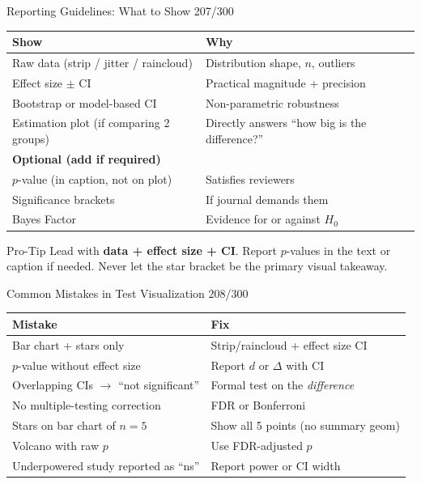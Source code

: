 \documentclass[10pt]{beamer}
\newcommand{\smark}[1]{\hfill{\scriptsize\color{codegray}#1}}
\begin{document}
\begin{frame}{Reporting Guidelines: What to Show}
\smark{207/300}
\centering\small
\begin{tabular}{@{}ll@{}}
    \toprule
    \textbf{Show} & \textbf{Why} \\
    \midrule
    Raw data (strip / jitter / raincloud)  & Distribution shape, $n$, outliers \\
    Effect size $\pm$ CI                    & Practical magnitude + precision \\
    Bootstrap or model-based CI             & Non-parametric robustness \\
    Estimation plot (if comparing 2 groups) & Directly answers ``how big is the difference?'' \\
    \midrule
    \textbf{Optional (add if required)} & \\
    \midrule
    $p$-value (in caption, not on plot)     & Satisfies reviewers \\
    Significance brackets                   & If journal demands them \\
    Bayes Factor                            & Evidence for or against $H_0$ \\
    \bottomrule
\end{tabular}

\vspace{0.3cm}
\begin{alertblock}{Pro-Tip}
    \scriptsize Lead with \textbf{data + effect size + CI}. Report $p$-values in the text or caption if needed. Never let the star bracket be the primary visual takeaway.
\end{alertblock}
\end{frame}

\begin{frame}{Common Mistakes in Test Visualization}
\smark{208/300}
\centering\small
\begin{tabular}{@{}ll@{}}
    \toprule
    \textbf{Mistake} & \textbf{Fix} \\
    \midrule
    Bar chart + stars only                     & Strip/raincloud + effect size CI \\
    $p$-value without effect size              & Report $d$ or $\Delta$ with CI \\
    Overlapping CIs $\to$ ``not significant''  & Formal test on the \emph{difference} \\
    No multiple-testing correction             & FDR or Bonferroni \\
    Stars on bar chart of $n = 5$              & Show all 5 points (no summary geom) \\
    Volcano with raw $p$                       & Use FDR-adjusted $p$ \\
    Underpowered study reported as ``ns''      & Report power or CI width \\
    \bottomrule
\end{tabular}
\end{frame}
\end{document}
